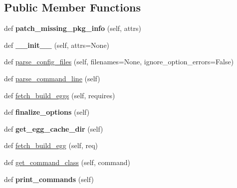 \subsection*{Public Member Functions}
\begin{DoxyCompactItemize}
\item 
\mbox{\label{classsetuptools_1_1dist_1_1_distribution_a63d311a3a213090ba459bb9fc8878473}} 
def {\bfseries patch\+\_\+missing\+\_\+pkg\+\_\+info} (self, attrs)
\item 
\mbox{\label{classsetuptools_1_1dist_1_1_distribution_a3ecc99f355b19d6327ec08139f2c069b}} 
def {\bfseries \+\_\+\+\_\+init\+\_\+\+\_\+} (self, attrs=None)
\item 
def \hyperlink{classsetuptools_1_1dist_1_1_distribution_a41d3a53939167a813c13fde672ce3970}{parse\+\_\+config\+\_\+files} (self, filenames=None, ignore\+\_\+option\+\_\+errors=False)
\item 
def \hyperlink{classsetuptools_1_1dist_1_1_distribution_aadf80b2f1a360bfd7dd1236d5888da38}{parse\+\_\+command\+\_\+line} (self)
\item 
def \hyperlink{classsetuptools_1_1dist_1_1_distribution_a3af6e048cd20731f68583089c6b06b57}{fetch\+\_\+build\+\_\+eggs} (self, requires)
\item 
\mbox{\label{classsetuptools_1_1dist_1_1_distribution_a7849615b07629cf6420a420ab46ea199}} 
def {\bfseries finalize\+\_\+options} (self)
\item 
\mbox{\label{classsetuptools_1_1dist_1_1_distribution_a0da6e9ec6ef0ce3f8c60f61b20d31589}} 
def {\bfseries get\+\_\+egg\+\_\+cache\+\_\+dir} (self)
\item 
def \hyperlink{classsetuptools_1_1dist_1_1_distribution_a17bce0b77bfb0a4d06aa9422f1e5e0bf}{fetch\+\_\+build\+\_\+egg} (self, req)
\item 
def \hyperlink{classsetuptools_1_1dist_1_1_distribution_a76159456291f4bb9ed2ccb935d480240}{get\+\_\+command\+\_\+class} (self, command)
\item 
\mbox{\label{classsetuptools_1_1dist_1_1_distribution_a7ea0a1191865dbac2d9110ce23f7461c}} 
def {\bfseries print\+\_\+commands} (self)

\end{DoxyCompactItemize}
